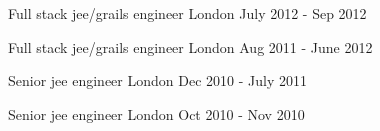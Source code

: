 \begin{cventries}
    \cventry
    {Full stack jee/grails engineer}
    {} 
    {London}
    {July 2012 - Sep 2012}
    {}
    {}

    \cventry
    {Full stack jee/grails engineer}
    {} 
    {London}
    {Aug 2011 - June 2012}
    {}
    {}

    \cventry
    {Senior jee engineer}
    {} 
    {London}
    {Dec 2010 - July 2011}
    {}
    {}

    \cventry
    {Senior jee engineer}
    {} 
    {London}
    {Oct 2010 - Nov 2010}
    {}
    {}
\end{cventries}



